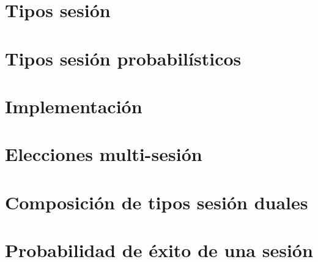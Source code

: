 \documentclass[11pt,a4paper]{tesis}
\begin{document}

\def\autor{Iván Pondal}
\def\tituloTesis{Inferencia de tipos sesión probabilísticos}
\def\runtitulo{Inferencia de tipos sesión probabilísticos}
\def\director{Hernán Melgratti}
\def\lugar{Buenos Aires, 2021}



\frontmatter
\pagestyle{empty}


\cleardoublepage


\cleardoublepage


\cleardoublepage
\tableofcontents

\listoftodos

\mainmatter
\pagestyle{headings}


\chapter{Tipos sesión}





\chapter{Tipos sesión probabilísticos}





\chapter{Implementación}



\chapter{Elecciones multi-sesión}



\chapter{Composición de tipos sesión duales}



\chapter{Probabilidad de éxito de una sesión}




\backmatter


\end{document}
